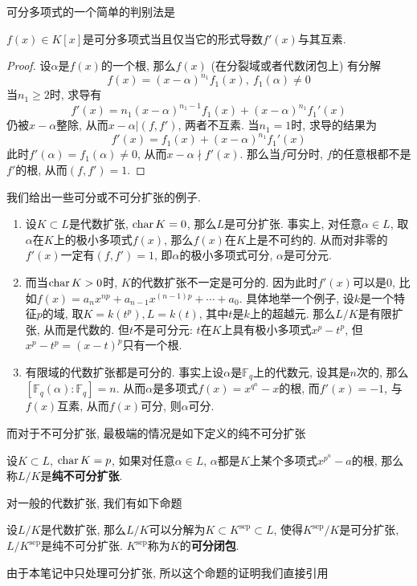 可分多项式的一个简单的判别法是
\begin{prop}
    $f(x)\in K[x]$是可分多项式当且仅当它的形式导数$f'(x)$与其互素.
\end{prop}
\begin{proof}
    设$\alpha$是$f(x)$的一个根, 那么$f(x)$ (在分裂域或者代数闭包上) 有分解
    \[f(x)=(x-\alpha)^{n_1}f_1(x),\ f_1(\alpha)\neq 0\]
    当$n_1\geq 2$时, 求导有
    \[f'(x)=n_1(x-\alpha)^{n_1-1}f_1(x)+(x-\alpha)^{n_1}f_1'(x)\]
    仍被$x-\alpha$整除, 从而$x-\alpha|(f,f')$, 两者不互素.
    当$n_1=1$时, 求导的结果为
    \[f'(x)=f_1(x)+(x-\alpha)^{n_1}f_1'(x)\]
    此时$f'(\alpha)=f_1(\alpha)\neq 0$, 从而$x-\alpha\nmid f'(x)$.
    那么当$f$可分时, $f$的任意根都不是$f'$的根, 从而$(f,f')=1$.
\end{proof}

\begin{eg}我们给出一些可分或不可分扩张的例子.
    \begin{enumerate}[(1)]
        \item 设$K\subset L$是代数扩张, $\operatorname{char}{K}=0$, 那么$L$是可分扩张.
        事实上, 对任意$\alpha\in L$, 取$\alpha$在$K$上的极小多项式$f(x)$, 那么$f(x)$在$K$上是不可约的.
        从而对非零的$f'(x)$一定有$(f,f')=1$, 即$\alpha$的极小多项式可分, $\alpha$是可分元.
        \item 而当$\operatorname{char}{K}>0$时, $K$的代数扩张不一定是可分的.
        因为此时$f'(x)$可以是$0$, 比如$f(x)=a_nx^{np}+a_{n-1}x^{(n-1)p}+\cdots+a_0$.
        具体地举一个例子, 设$k$是一个特征$p$的域, 取$K=k(t^p),L=k(t)$, 其中$t$是$k$上的超越元.
        那么$L/K$是有限扩张, 从而是代数的.
        但$t$不是可分元: $t$在$K$上具有极小多项式$x^p-t^p$, 但$x^p-t^p=(x-t)^p$只有一个根.
        \item 有限域的代数扩张都是可分的.
        事实上设$\alpha$是$\mathbb{F}_q$上的代数元, 设其是$n$次的, 那么$[\mathbb{F}_q(\alpha):\mathbb{F}_q]=n$.
        从而$\alpha$是多项式$f(x)=x^{q^n}-x$的根, 而$f'(x)=-1$, 与$f(x)$互素, 从而$f(x)$可分, 则$\alpha$可分.
    \end{enumerate}
\end{eg}

而对于不可分扩张, 最极端的情况是如下定义的纯不可分扩张
\begin{defn}
    设$K\subset L$, $\operatorname{char}{K}=p$, 如果对任意$\alpha\in L$, $\alpha$都是$K$上某个多项式$x^{p^n}-a$的根, 那么称$L/K$是\textbf{纯不可分扩张}.
\end{defn}

对一般的代数扩张, 我们有如下命题
\begin{thm}
    设$L/K$是代数扩张, 那么$L/K$可以分解为$K\subset K^{\mathrm{sep}}\subset L$, 使得$K^{\mathrm{sep}}/K$是可分扩张, $L/K^{\mathrm{sep}}$是纯不可分扩张.
    $K^{\mathrm{sep}}$称为$K$的\textbf{可分闭包}.
\end{thm}
由于本笔记中只处理可分扩张, 所以这个命题的证明我们直接引用~\parencite[第V章, 命题6.6]{Lang}
